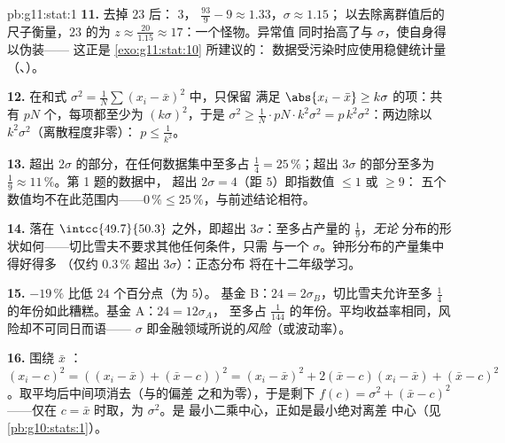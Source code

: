 \begin{solution}{pb:g11:stat:1}
\textbf{11.} 去掉 $23$ 后： $3$，
$\frac{93}{9} - 9 \approx 1.33$，$\sigma \approx 1.15$；
以去除离群值后的尺子衡量，$23$ 的为
$z \approx \frac{20}{1.15} \approx 17$：一个怪物。异常值
同时抬高了与 $\sigma$，使自身得以伪装——
这正是 \cref{exo:g11:stat:10} 所建议的：
数据受污染时应使用稳健统计量（、）。

\textbf{12.} 在和式
$\sigma^2 = \frac1N \sum (x_i - \bar x)^2$ 中，只保留
满足 $\abs{x_i - \bar x} \geq k\sigma$ 的项：共有 $pN$
个，每项都至少为 $(k\sigma)^2$，于是
$\sigma^2 \geq \frac{1}{N} \cdot pN \cdot k^2\sigma^2 =
p\,k^2\sigma^2$：两边除以 $k^2 \sigma^2$（离散程度非零）：
$p \leq \frac{1}{k^2}$。

\textbf{13.} 超出 $2\sigma$ 的部分，在任何数据集中至多占
$\frac14 = 25\,\%$；超出 $3\sigma$ 的部分至多为
$\frac19 \approx 11\,\%$。第 1 题的数据中，
超出 $2\sigma = 4$（距 $5$）即指数值 $\leq 1$ 或 $\geq 9$：
五个数值均不在此范围内——$0\,\% \leq 25\,\%$，与前述结论相符。

\textbf{14.} 落在 $\intcc{49.7}{50.3}$ 之外，即超出
$3\sigma$：至多占产量的 $\frac19$，\emph{无论}
分布的形状如何——切比雪夫不要求其他任何条件，只需
与一个 $\sigma$。钟形分布的产量集中得好得多
（仅约 $0.3\,\%$ 超出 $3\sigma$）：正态分布
将在十二年级学习。

\textbf{15.} $-19\,\%$ 比低 $24$ 个百分点（为 $5$）。
基金 B：$24 = 2\sigma_B$，切比雪夫允许至多
$\frac14$ 的年份如此糟糕。基金 A：$24 = 12\sigma_A$，
至多占 $\frac{1}{144}$ 的年份。平均收益率相同，风险却不可同日而语——
$\sigma$ 即金融领域所说的\emph{风险}（或波动率）。

\textbf{16.} 围绕 $\bar x$ ：
$(x_i - c)^2 = \left((x_i - \bar x) + (\bar x - c)\right)^2
= (x_i - \bar x)^2 + 2(\bar x - c)(x_i - \bar x) +
(\bar x - c)^2$。取平均后中间项消去（与的偏差
之和为零），于是剩下
$f(c) = \sigma^2 + (\bar x - c)^2$——仅在
$c = \bar x$ 时取，为 $\sigma^2$。是
最小二乘中心，正如是最小绝对离差
中心（见\cref{pb:g10:stats:1}）。


\end{solution}
